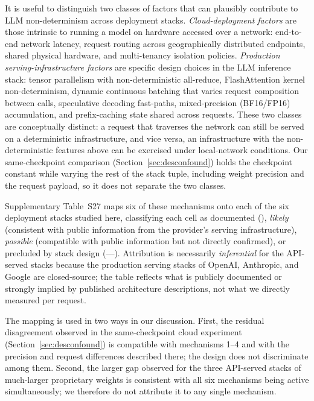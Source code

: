 \documentclass[preprint,review,12pt,authoryear]{elsarticle}
\begin{document}
It is useful to distinguish two classes of factors that can plausibly contribute to LLM non-determinism across deployment stacks.
\emph{Cloud-deployment factors} are those intrinsic to running a model on hardware accessed over a network: end-to-end network latency, request routing across geographically distributed endpoints, shared physical hardware, and multi-tenancy isolation policies.
\emph{Production serving-infrastructure factors} are specific design choices in the LLM inference stack: tensor parallelism with non-deterministic all-reduce, FlashAttention kernel non-determinism, dynamic continuous batching that varies request composition between calls, speculative decoding fast-paths, mixed-precision (BF16/FP16) accumulation, and prefix-caching state shared across requests.
These two classes are conceptually distinct: a request that traverses the network can still be served on a deterministic infrastructure, and vice versa, an infrastructure with the non-deterministic features above can be exercised under local-network conditions.
Our same-checkpoint comparison (Section~\ref{sec:desconfound}) holds the checkpoint constant while varying the rest of the stack tuple, including weight precision and the request payload, so it does not separate the two classes.

\noindent Supplementary Table~S27 maps six of these mechanisms onto each of the six deployment stacks studied here, classifying each cell as documented (\checkmark), \emph{likely} (consistent with public information from the provider's serving infrastructure), \emph{possible} (compatible with public information but not directly confirmed), or precluded by stack design (---).
Attribution is necessarily \emph{inferential} for the API-served stacks because the production serving stacks of OpenAI, Anthropic, and Google are closed-source; the table reflects what is publicly documented or strongly implied by published architecture descriptions, not what we directly measured per request.


\noindent The mapping is used in two ways in our discussion.
First, the residual disagreement observed in the same-checkpoint cloud experiment (Section~\ref{sec:desconfound}) is compatible with mechanisms 1--4 and with the precision and request differences described there; the design does not discriminate among them.
Second, the larger gap observed for the three API-served stacks of much-larger proprietary weights is consistent with all six mechanisms being active simultaneously; we therefore do not attribute it to any single mechanism.
\end{document}
